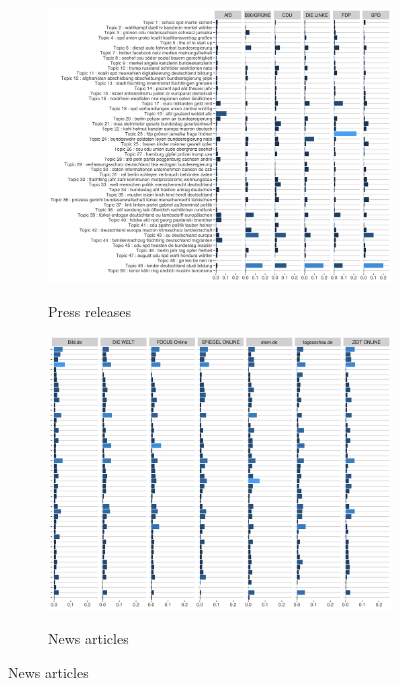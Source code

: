 \documentclass[12pt,a4paper,notitlepage]{article}
\begin{document}
\begin{figure}[H]
	\begin{center}
	\caption{Topic probablity}
		\begin{subfigure}[normla]{0.49\textwidth}
			\caption{Press releases}
			\includegraphics[width=\textwidth]{../figs/topic_proportion_press}
			\label{fig_tf_press}
		\end{subfigure}
		\begin{subfigure}[normla]{0.49\textwidth}
			\caption{News articles}
			\includegraphics[width=\textwidth]{../figs/topic_proportion_news}
			\label{fig_tf_news}
		\end{subfigure}
	\end{center}
\end{figure}
\end{document}
